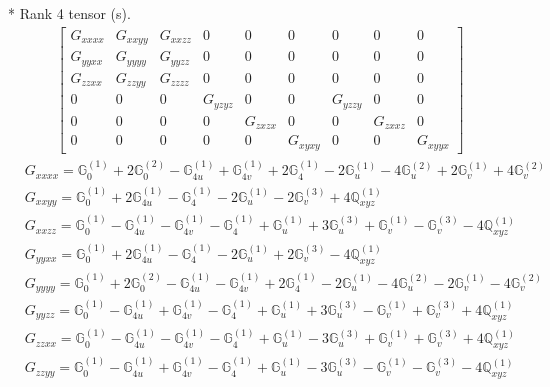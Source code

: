 \documentclass[fleqn,8pt,landscape]{jsarticle}
\begin{document}
* Rank 4 tensor (s).
\begin{align*}
\begin{bmatrix} G_{xxxx} & G_{xxyy} & G_{xxzz} & 0 & 0 & 0 & 0 & 0 & 0 \\ G_{yyxx} & G_{yyyy} & G_{yyzz} & 0 & 0 & 0 & 0 & 0 & 0 \\ G_{zzxx} & G_{zzyy} & G_{zzzz} & 0 & 0 & 0 & 0 & 0 & 0 \\ 0 & 0 & 0 & G_{yzyz} & 0 & 0 & G_{yzzy} & 0 & 0 \\ 0 & 0 & 0 & 0 & G_{zxzx} & 0 & 0 & G_{zxxz} & 0 \\ 0 & 0 & 0 & 0 & 0 & G_{xyxy} & 0 & 0 & G_{xyyx} \end{bmatrix}
\end{align*}
\begin{align*}
& G_{xxxx} = \mathbb{G}_{0}^{(1)} + 2 \mathbb{G}_{0}^{(2)} - \mathbb{G}_{4u}^{(1)} + \mathbb{G}_{4v}^{(1)} + 2 \mathbb{G}_{4}^{(1)} - 2 \mathbb{G}_{u}^{(1)} - 4 \mathbb{G}_{u}^{(2)} + 2 \mathbb{G}_{v}^{(1)} + 4 \mathbb{G}_{v}^{(2)} \\
& G_{xxyy} = \mathbb{G}_{0}^{(1)} + 2 \mathbb{G}_{4u}^{(1)} - \mathbb{G}_{4}^{(1)} - 2 \mathbb{G}_{u}^{(1)} - 2 \mathbb{G}_{v}^{(3)} + 4 \mathbb{Q}_{xyz}^{(1)} \\
& G_{xxzz} = \mathbb{G}_{0}^{(1)} - \mathbb{G}_{4u}^{(1)} - \mathbb{G}_{4v}^{(1)} - \mathbb{G}_{4}^{(1)} + \mathbb{G}_{u}^{(1)} + 3 \mathbb{G}_{u}^{(3)} + \mathbb{G}_{v}^{(1)} - \mathbb{G}_{v}^{(3)} - 4 \mathbb{Q}_{xyz}^{(1)} \\
& G_{yyxx} = \mathbb{G}_{0}^{(1)} + 2 \mathbb{G}_{4u}^{(1)} - \mathbb{G}_{4}^{(1)} - 2 \mathbb{G}_{u}^{(1)} + 2 \mathbb{G}_{v}^{(3)} - 4 \mathbb{Q}_{xyz}^{(1)} \\
& G_{yyyy} = \mathbb{G}_{0}^{(1)} + 2 \mathbb{G}_{0}^{(2)} - \mathbb{G}_{4u}^{(1)} - \mathbb{G}_{4v}^{(1)} + 2 \mathbb{G}_{4}^{(1)} - 2 \mathbb{G}_{u}^{(1)} - 4 \mathbb{G}_{u}^{(2)} - 2 \mathbb{G}_{v}^{(1)} - 4 \mathbb{G}_{v}^{(2)} \\
& G_{yyzz} = \mathbb{G}_{0}^{(1)} - \mathbb{G}_{4u}^{(1)} + \mathbb{G}_{4v}^{(1)} - \mathbb{G}_{4}^{(1)} + \mathbb{G}_{u}^{(1)} + 3 \mathbb{G}_{u}^{(3)} - \mathbb{G}_{v}^{(1)} + \mathbb{G}_{v}^{(3)} + 4 \mathbb{Q}_{xyz}^{(1)} \\
& G_{zzxx} = \mathbb{G}_{0}^{(1)} - \mathbb{G}_{4u}^{(1)} - \mathbb{G}_{4v}^{(1)} - \mathbb{G}_{4}^{(1)} + \mathbb{G}_{u}^{(1)} - 3 \mathbb{G}_{u}^{(3)} + \mathbb{G}_{v}^{(1)} + \mathbb{G}_{v}^{(3)} + 4 \mathbb{Q}_{xyz}^{(1)} \\
& G_{zzyy} = \mathbb{G}_{0}^{(1)} - \mathbb{G}_{4u}^{(1)} + \mathbb{G}_{4v}^{(1)} - \mathbb{G}_{4}^{(1)} + \mathbb{G}_{u}^{(1)} - 3 \mathbb{G}_{u}^{(3)} - \mathbb{G}_{v}^{(1)} - \mathbb{G}_{v}^{(3)} - 4 \mathbb{Q}_{xyz}^{(1)} \\

\end{align*}
\end{document}
